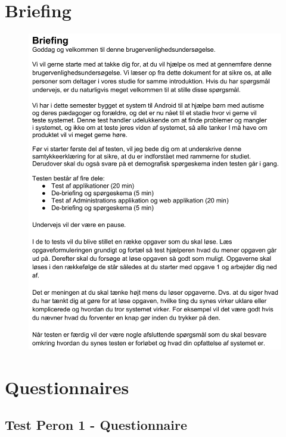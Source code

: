 \section*{Briefing}
\begin{figure}[H]
	\centering
		\includegraphics[width=1.00\textwidth]{input/appendices/usability-briefing.png}
	\label{fig:usability-briefing}
\end{figure}


\section*{Questionnaires}
\subsection*{Test Peron 1 - Questionnaire}

